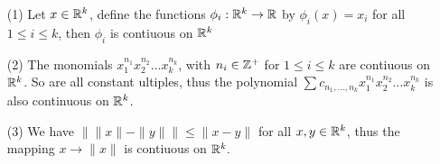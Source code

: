 \begin{example}
    \begin{enumerate}
        \item[(1)] Let $x \in \mathbb{R}^k$, define the functions  $\phi_i:\mathbb{R}^k \rightarrow \mathbb{R}$ by
            $\phi_i(x)=x_i$ for all  $1 \leq i \leq k$, then  $\phi_i$ is contiuous on  $\mathbb{R}^k$

        \item[(2)] The monomials  $x_1^{n_1}x_2^{n_2} \dots x_k^{n_k}$, with $n_i \in \mathbb{Z}^+$ for
             $1 \leq i \leq k$ are contiuous on  $\mathbb{R}^k$. So are all constant ultiples, thus the
             polynomial  $\sum{c_{n_1, \dots, n_k}}x_1^{n_1}x_2^{n_2} \dots x_k^{n_k}$ is also
             continuous on $\mathbb{R}^k$.

         \item[(3)] We have  $\|\|x\|-\|y\|\| \leq \|x-y\|$ for all  $x,y \in \mathbb{R}^k$, thus the
             mapping  $x \rightarrow \|x\|$ is contiuous on $\mathbb{R}^k.$
    \end{enumerate}
\end{example}
